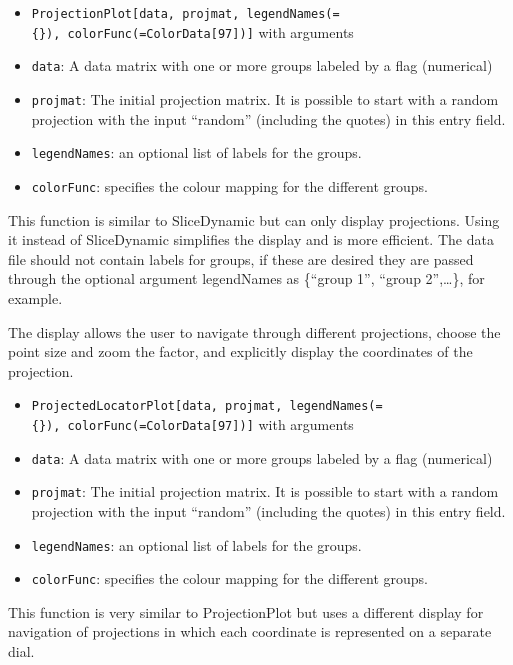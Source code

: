 \documentclass[]{interact}
\theoremstyle{plain}%
\theoremstyle{definition}
\theoremstyle{remark}
\begin{document}
\begin{itemize}
\item
  \texttt{ProjectionPlot{[}data,\ projmat,\ legendNames(=\{\}),\ colorFunc(=ColorData{[}97{]}){]}}
  with arguments
\item
  \texttt{data}: A data matrix with one or more groups labeled by a flag
  (numerical)
\item
  \texttt{projmat}: The initial projection matrix. It is possible to
  start with a random projection with the input ``random'' (including
  the quotes) in this entry field.
\item
  \texttt{legendNames}: an optional list of labels for the groups.
\item
  \texttt{colorFunc}: specifies the colour mapping for the different
  groups.
\end{itemize}

This function is similar to SliceDynamic but can only display
projections. Using it instead of SliceDynamic simplifies the display and
is more efficient. The data file should not contain labels for groups,
if these are desired they are passed through the optional argument
legendNames as \{``group 1'', ``group 2'',\ldots\}, for example.

The display allows the user to navigate through different projections,
choose the point size and zoom the factor, and explicitly display the
coordinates of the projection.

\begin{itemize}
\item
  \texttt{ProjectedLocatorPlot{[}data,\ projmat,\ legendNames(=\{\}),\ colorFunc(=ColorData{[}97{]}){]}}
  with arguments
\item
  \texttt{data}: A data matrix with one or more groups labeled by a flag
  (numerical)
\item
  \texttt{projmat}: The initial projection matrix. It is possible to
  start with a random projection with the input ``random'' (including
  the quotes) in this entry field.
\item
  \texttt{legendNames}: an optional list of labels for the groups.
\item
  \texttt{colorFunc}: specifies the colour mapping for the different
  groups.
\end{itemize}

This function is very similar to ProjectionPlot but uses a different
display for navigation of projections in which each coordinate is
represented on a separate dial.
\end{document}
